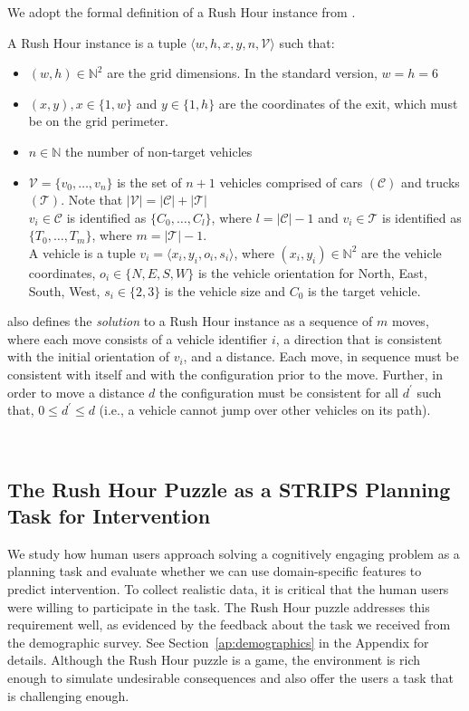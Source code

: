 We adopt the formal definition of a Rush Hour instance from \cite{flake2002}. 
\begin{definition} 
\label{def:rush}
A \textnormal{Rush Hour instance} is a tuple $\langle w,h,x,y,n,\mathcal{V}\rangle$ such that:
\begin{itemize}
\item $(w,h) \in {\mathbb{N}}^2$ are the grid dimensions. In the standard version, $w=h=6$
\item $(x,y), x\in\lbrace 1,w\rbrace$ and $y\in\lbrace 1,h\rbrace$ are the coordinates of the exit, which must be on the grid perimeter.
\item $n \in \mathbb{N}$ the number of non-target vehicles
\item $\mathcal{V}=\lbrace v_0, \ldots, v_n \rbrace$ is the set of $n+1$ vehicles comprised of cars $(\mathcal{C})$ and trucks $(\mathcal{T})$. Note that $|\mathcal{V}|=|\mathcal{C}|+|\mathcal{T}|$
\\$v_i \in \mathcal{C}$ is identified as $\lbrace C_0,\ldots,C_l \rbrace$, where $l=|\mathcal{C}|-1$ and $v_i \in \mathcal{T}$ is identified as $\lbrace T_0,\ldots,T_m \rbrace$, where $m=|\mathcal{T}|-1$.
\\A vehicle is a tuple $v_i=\langle x_i,y_i,o_i,s_i \rangle$, where $(x_i,y_i) \in {\mathbb{N}}^2$ are the vehicle coordinates, $o_i \in \lbrace N,E,S,W\rbrace$ is the vehicle orientation for North, East, South, West, $s_i \in \lbrace2,3\rbrace$ is the vehicle size and $C_0$ is the target vehicle.
\end{itemize}
\label{rushdef}
\end{definition}
\cite{flake2002} also defines the \textit{solution} to a Rush Hour instance as a sequence of $m$ moves, where each move consists of a vehicle identifier $i$, a direction that is consistent with the initial orientation of $v_i$, and a distance. 
Each move, in sequence must be consistent with itself and with the configuration prior to the move. 
Further, in order to move a distance $d$ the configuration must be consistent for all $d^\prime$ such that, $0\leqslant d^\prime \leqslant d$ (i.e., a vehicle cannot jump over other vehicles on its path).

~\subsection{The Rush Hour Puzzle as a STRIPS Planning Task for Intervention}
\label{sec:rushhourstrips}
We study how human users approach solving a cognitively engaging problem as a planning task and evaluate whether we can use domain-specific features to predict intervention. 
To collect realistic data, it is critical that the human users were willing to participate in the task. 
The Rush Hour puzzle addresses this requirement well, as evidenced by the feedback about the task we received from the demographic survey. See Section~\ref{ap:demographics} in the Appendix for details.
Although the Rush Hour puzzle is a game, the environment is rich enough to simulate undesirable consequences and also offer the users a task that is challenging enough.


